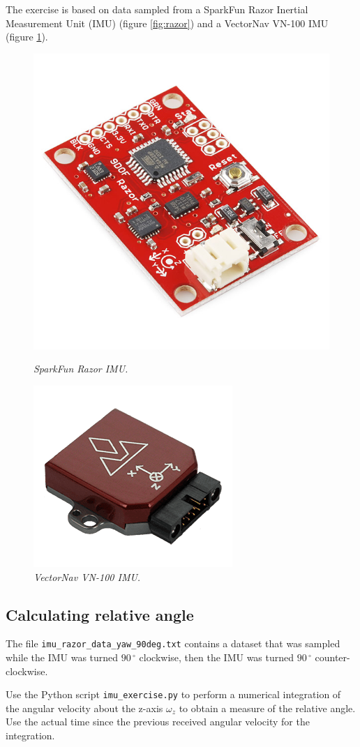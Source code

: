 \documentclass[paper=letter, fontsize=10pt]{article}
\begin{document}
The exercise is based on data sampled from a SparkFun Razor Inertial Measurement Unit (IMU) (figure \ref{fig:razor}) and a VectorNav VN-100 IMU (figure \ref{fig:vn100}). 
\begin{figure}
\centering
\begin{minipage}{.5\textwidth}
	\centering
	\includegraphics[width=.4\linewidth]{images/sparkfun_razor.jpg}
	\caption{\textit{SparkFun Razor IMU.}}
	\label{fig:razor}
\end{minipage}%
\begin{minipage}{.5\textwidth}
	\centering
	\includegraphics[width=.4\linewidth]{images/vn-100-rugged.png}
	\caption{\textit{VectorNav VN-100 IMU.}}
	\label{fig:vn100}
\end{minipage}
\end{figure}


\subsection{Calculating relative angle}
The file \texttt{imu\_razor\_data\_yaw\_90deg.txt} contains a dataset that was sampled while the IMU was turned $90\,^{\circ}$ clockwise, then the IMU was turned $90\,^{\circ}$ counter-clockwise. 

Use the Python script \texttt{imu\_exercise.py} to perform a numerical integration of the angular velocity about the z-axis $\omega_z$ to obtain a measure of the relative angle. Use the actual time since the previous received angular velocity for the integration.
\end{document}
